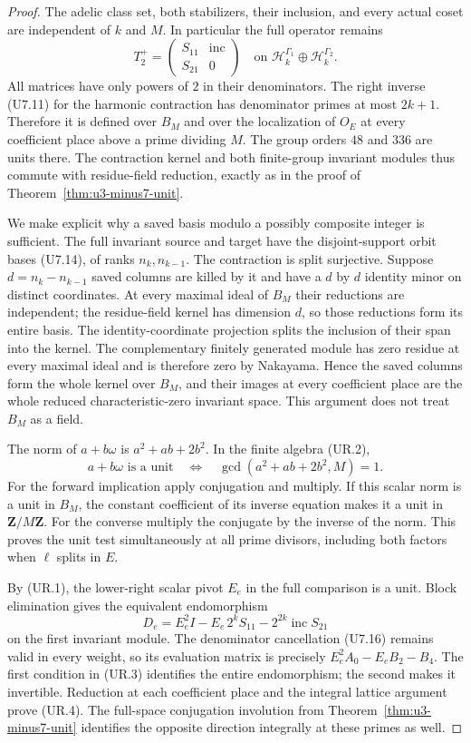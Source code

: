\documentclass[11pt,a4paper]{article}
\theoremstyle{definition}
\begin{document}
\begin{proof}
The adelic class set, both stabilizers, their inclusion, and every
actual coset are independent of $k$ and $M$. In particular the full
operator remains
\[
 T_2^+=\begin{pmatrix}S_{11}&\operatorname{inc}\\S_{21}&0\end{pmatrix}
 \quad\text{on }\mathcal H_k^{\Gamma_1}
                    \oplus\mathcal H_k^{\Gamma_2}.
 \tag{UR.5}
\]
All matrices have only powers of $2$ in their denominators. The
right inverse (U7.11) for the harmonic contraction has denominator
primes at most $2k+1$. Therefore it is defined over $B_M$ and over
the localization of $O_E$ at every coefficient place above a prime
dividing $M$. The group orders $48$ and $336$ are units there.
The contraction kernel and both finite-group invariant modules
thus commute with residue-field reduction, exactly as in the
proof of Theorem~\ref{thm:u3-minus7-unit}.

We make explicit why a saved basis modulo a possibly composite
integer is sufficient. The full invariant source and target have
the disjoint-support orbit bases (U7.14), of ranks $n_k,n_{k-1}$.
The contraction is split surjective. Suppose $d=n_k-n_{k-1}$
saved columns are killed by it and have a $d$ by $d$ identity
minor on distinct coordinates. At every maximal ideal of $B_M$
their reductions are independent; the residue-field kernel has
dimension $d$, so those reductions form its entire basis. The
identity-coordinate projection splits the inclusion of their
span into the kernel. The complementary finitely generated
module has zero residue at every maximal ideal and is therefore
zero by Nakayama. Hence the saved columns form the whole kernel
over $B_M$, and their images at every coefficient place are the
whole reduced characteristic-zero invariant space. This argument
does not treat $B_M$ as a field.

The norm of $a+b\omega$ is $a^2+ab+2b^2$. In the finite algebra
(UR.2),
\[
 a+b\omega\text{ is a unit}
 \quad\Longleftrightarrow\quad
 \gcd(a^2+ab+2b^2,M)=1.
 \tag{UR.6}
\]
For the forward implication apply conjugation and multiply.
If this scalar norm is a unit in $B_M$, the constant coefficient
of its inverse equation makes it a unit in $\mathbf Z/M\mathbf Z$.
For the converse multiply the conjugate by the inverse of the norm.
This proves the unit test simultaneously at all prime divisors,
including both factors when $\ell$ splits in $E$.

By (UR.1), the lower-right scalar pivot $E_e$ in the full
comparison is a unit. Block elimination gives the equivalent
endomorphism
\[
 D_e=E_e^2I-E_e\,2^kS_{11}
                  -2^{2k}\operatorname{inc}S_{21}
 \tag{UR.7}
\]
on the first invariant module. The denominator cancellation
(U7.16) remains valid in every weight, so its evaluation matrix
is precisely $E_e^2A_0-E_eB_2-B_4$. The first condition in
(UR.3) identifies the entire endomorphism; the second makes it
invertible. Reduction at each coefficient place and the integral
lattice argument prove (UR.4). The full-space conjugation
involution from Theorem~\ref{thm:u3-minus7-unit} identifies the
opposite direction integrally at these primes as well.
\end{proof}
\end{document}
